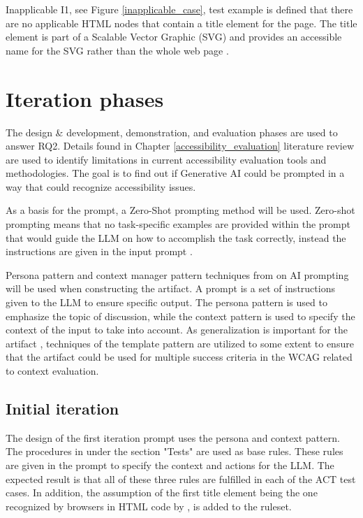 Inapplicable I1, see Figure \ref{inapplicable_case}, test example is defined that there are no applicable HTML nodes that contain a title element for the page. The title element is part of a Scalable Vector Graphic (SVG) and provides an accessible name for the SVG rather than the whole web page \citep{svg_title}.


\section{Iteration phases}

The design \& development, demonstration, and evaluation phases are used to answer RQ2. Details found in Chapter \ref{accessibility_evaluation} literature review are used to identify limitations in current accessibility evaluation tools and methodologies. The goal is to find out if Generative AI could be prompted in a way that could recognize accessibility issues. 

As a basis for the prompt, a Zero-Shot prompting method will be used. Zero-shot prompting means that no task-specific examples are provided within the prompt that would guide the LLM on how to accomplish the task correctly, instead the instructions are given in the input prompt \citep{kojima2023large}.

Persona pattern and context manager pattern techniques from \textcite{white2023prompt} on AI prompting will be used when constructing the artifact. A prompt is a set of instructions given to the LLM to ensure specific output. The persona pattern is used to emphasize the topic of discussion, while the context pattern is used to specify the context of the input to take into account. As generalization is important for the artifact \citep{design_science_eval}, techniques of the template pattern are utilized to some extent to ensure that the artifact could be used for multiple success criteria in the WCAG related to context evaluation.

\subsection{Initial iteration}

The design of the first iteration prompt uses the persona and context pattern. The procedures in \textcite{g88} under the section "Tests" are used as base rules. These rules are given in the prompt to specify the context and actions for the LLM. The expected result is that all of these three rules are fulfilled in each of the ACT test cases. In addition, the assumption of the first title element being the one recognized by browsers in HTML code by \textcite{act_rule_g88}, is added to the ruleset.

